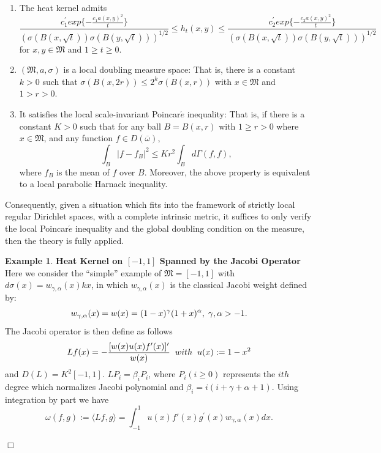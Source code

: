 \documentclass[10pt]{article}
\theoremstyle{definition}
\newtheorem{ex}[thm]{Example}
\numberwithin{equation}{section}
\begin{document}
\begin{enumerate}
\item[(i)] The heat kernel admits
	\begin{equation}\label{E}
		\frac{c_1 ^{\prime}exp \{ - \frac{c_1 a (x,y)^2}{t}\}}{\left(\sigma(B(x,\sqrt{t}))\sigma(B(y,\sqrt{t}))\right)^{1/2}} \leq h_t (x,y) \leq \frac{c_2 ^{\prime}exp \{ - \frac{c_2 a(x,y)^2}{t}\}}{\left(\sigma(B(x,\sqrt{t}))\sigma(B(y,\sqrt{t}))\right)^{1/2}}
	\end{equation}
	for $x,y\in \mathfrak{M}$ and $1\geq t \geq 0$.
\item[(ii)(a)] $(\mathfrak{M},a,\sigma)$ is a local doubling measure space: That is, there is a constant $k >0$ such that $\sigma (B(x,2r)) \leq 2^k \sigma (B(x,r))$ with $ x \in \mathfrak{M}$ and $1>r>0$.
\item[(b)] It satisfies the local scale-invariant Poincar$\acute{e}$ inequality: That is, if there is a constant $K >0$ such that for any ball $ B = B(x,r)$ with $1\geq r >0$ where $x \in \mathfrak{M}$, and any function $f\in D(\overline{\omega})$,
	$$ \int_B |f-f_B|^2 \leq Kr^2 \int_B d \varGamma(f,f),$$
where $f_B$ is the mean of $f$ over $B$. Moreover, the above property
	is equivalent to a local parabolic Harnack inequality.
\end{enumerate}
Consequently, given a situation which fits into the framework of strictly local regular Dirichlet spaces, with a complete intrinsic metric, it suffices to only verify the local Poincar$\acute{e}$ inequality and the global doubling condition on the measure, then the theory is fully applied.
	\begin{ex}
		\normalfont
		\textbf{Heat Kernel on $[-1, 1]$ Spanned by the Jacobi Operator}\\
		Here we consider the “simple” example of $\mathfrak{M} = [-1, 1]$ with $d \sigma (x) = w_{\gamma, \alpha} (x)kx$, in which $w_{\gamma, \alpha} (x)$ is the classical Jacobi weight defined by:
		$$ w_{\gamma, \alpha} (x) = w (x) = (1-x)^{\gamma} (1+x)^{\alpha}, \hspace{0.1 cm} \gamma, \alpha > -1. $$
		The Jacobi operator is then define as follows\\
		$$Lf(x) = -\frac{[w(x)u(x) f'(x)]^{\prime}}{w(x)} \hspace{0.2 cm} with \hspace{0.2 cm} u(x) := 1-x^2 $$
		and $ D(L) = K^2[-1, 1]$. $LP_i = \beta_i P_i$, where $ P_i (i \geq 0)$ represents the $ith$ degree which normalizes  Jacobi polynomial and $ \beta_i = i(i + \gamma + \alpha + 1)$. Using integration by part we have
		$$ \omega (f,g) := \langle Lf,g \rangle = \int_{-1}^{1} u(x) f'(x) g^{\prime} (x) w_{\gamma, \alpha} (x) dx.$$
	\end{ex}\hfill{$\Box$}
	
\end{document}

